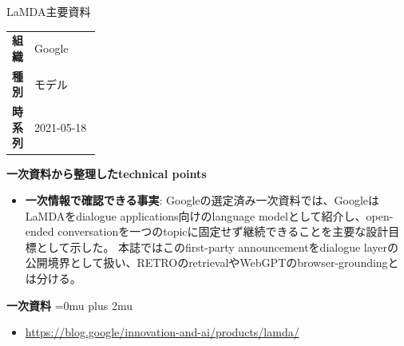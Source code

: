 \begin{technicalnote}{LaMDA}{主要資料}
\begingroup
\begin{tabularx}{\linewidth}{@{}>{\bfseries}p{0.22\linewidth}X@{}}
組織 & Google \\
種別 & モデル \\
時系列 & 2021-05-18 \\
\end{tabularx}
\smallskip
\begin{minipage}{\linewidth}
{\bfseries 一次資料から整理したtechnical points}
\begin{itemize}[leftmargin=1.5em,itemsep=0.35em]
\item \textbf{一次情報で確認できる事実}: Googleの選定済み一次資料では、GoogleはLaMDAをdialogue applications向けのlanguage modelとして紹介し、open-ended conversationを一つのtopicに固定せず継続できることを主要な設計目標として示した。 本誌ではこのfirst-party announcementをdialogue layerの公開境界として扱い、RETROのretrievalやWebGPTのbrowser-groundingとは分ける。
\end{itemize}
\begin{minipage}{\linewidth}
\begin{samepage}
{\bfseries 一次資料}
\begingroup\sloppy
\Urlmuskip=0mu plus 2mu\relax
\begin{itemize}[leftmargin=1.5em,itemsep=0.25em]
\item {\scriptsize\url{https://blog.google/innovation-and-ai/products/lamda/}}
\end{itemize}
\endgroup
\end{samepage}
\end{minipage}
\end{minipage}
\endgroup
\end{technicalnote}
\medskip

